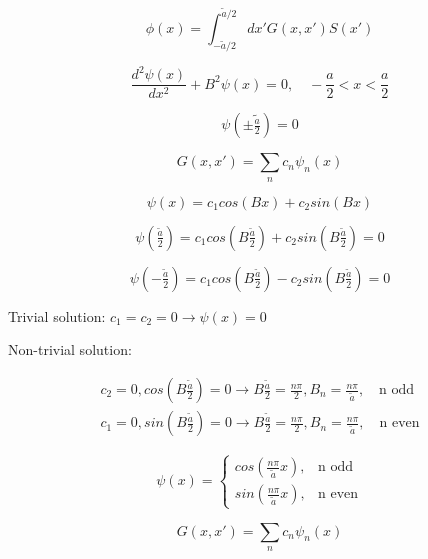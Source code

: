 \documentclass[12pt]{article}
\begin{document}
\begin{equation*}
\phi(x) = \int_{-\tilde{a}/2}^{\tilde{a}/2}dx'G(x,x')S(x')
\end{equation*}

\begin{equation*}
\frac{d^2\psi(x)}{dx^2} + B^2\psi(x) = 0,\quad
-\frac{a}{2} < x < \frac{a}{2}
\end{equation*}

\begin{equation*}
\psi\left(\pm\tilde{\tfrac{a}{2}}\right) = 0
\end{equation*}

\begin{equation*}
G(x,x') = \sum_n c_n \psi_n(x)
\end{equation*}

\begin{equation*}
\psi(x) = c_1cos(Bx) + c_2sin(Bx)
\end{equation*}

\begin{equation*}
\psi(\tfrac{\tilde{a}}{2}) = c_1cos(B\tfrac{\tilde{a}}{2}) + c_2sin(B\tfrac{\tilde{a}}{2}) = 0
\end{equation*}

\begin{equation*}
\psi(-\tfrac{\tilde{a}}{2}) = c_1cos(B\tfrac{\tilde{a}}{2}) - c_2sin(B\tfrac{\tilde{a}}{2}) = 0
\end{equation*}

Trivial solution: $c_1 = c_2 = 0 \rightarrow \psi(x) = 0$


Non-trivial solution:

\begin{gather*}
c_2 = 0, cos(B\tfrac{\tilde{a}}{2}) = 0 \rightarrow B\frac{\tilde{a}}{2} = \frac{n\pi}{2}, B_n = \frac{n\pi}{\tilde{a}},\quad\text{n odd} \\
c_1 = 0, sin(B\tfrac{\tilde{a}}{2}) = 0 \rightarrow B\frac{\tilde{a}}{2} = \frac{n\pi}{2}, B_n = \frac{n\pi}{\tilde{a}},\quad\text{n even}
\end{gather*}

\begin{equation*}
  \psi(x)=\begin{cases}
    cos(\tfrac{n\pi}{\tilde{a}}x), & \text{n odd} \\
    sin(\tfrac{n\pi}{\tilde{a}}x), & \text{n even}
  \end{cases}
\end{equation*}

\begin{equation*}
G(x,x') = \sum_n c_n \psi_n(x)
\end{equation*}
\end{document}
